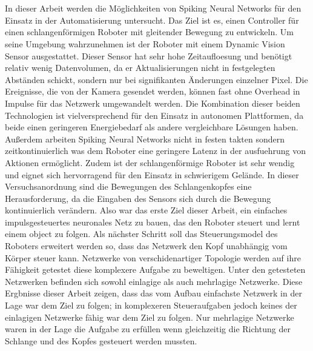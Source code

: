 \chapter{\abstractname}
In dieser Arbeit werden die Möglichkeiten von Spiking Neural Networks für den Einsatz in der Automatisierung untersucht. Das Ziel ist es, einen Controller für einen schlangenförmigen Roboter mit gleitender Bewegung zu entwickeln. Um seine Umgebung wahrzunehmen ist der Roboter mit einem Dynamic Vision Sensor ausgestattet. Dieser Sensor hat sehr hohe Zeitaufloesung und benötigt relativ wenig Datenvolumen, da er Aktualisierungen nicht in festgelegten Abständen schickt, sondern nur bei signifikanten Änderungen einzelner Pixel. Die Ereignisse, die von der Kamera gesendet werden, können fast ohne Overhead in Impulse für das Netzwerk umgewandelt werden. Die Kombination dieser beiden Technologien ist vielversprechend für den Einsatz in autonomen Plattformen, da beide einen geringeren Energiebedarf als andere vergleichbare Lösungen haben. Außerdem arbeiten Spiking Neural Networks nicht in festen takten sondern zeitkontinuierlich was dem Roboter eine geringere Latenz in der ausfuehrung von Aktionen ermöglicht. Zudem ist der schlangenförmige Roboter ist sehr wendig und eignet sich hervorragend für den Einsatz in schwierigem Gelände.
In dieser Versuchsanordnung sind die Bewegungen des Schlangenkopfes eine Herausforderung, da die Eingaben des Sensors sich durch die Bewegung kontinuierlich verändern. Also war das erste Ziel dieser Arbeit, ein einfaches impulsgesteuertes neuronales Netz zu bauen, das den Roboter steuert und lernt einem object zu folgen. Als nächster Schritt soll das Steuerungsmodel des Roboters erweitert werden so, dass das Netzwerk den Kopf unabhängig vom Körper steuer kann. Netzwerke von verschidenartiger Topologie werden auf ihre Fähigkeit getestet diese komplexere Aufgabe zu beweltigen. Unter den getesteten Netzwerken befinden sich sowohl einlagige als auch mehrlagige Netzwerke.
Diese Ergbnisse dieser Arbeit zeigen, dass das vom Aufbau einfachste Netzwerk in der Lage war dem Ziel zu folgen; in komplexeren Steueraufgaben jedoch keines der einlagigen Netzwerke fähig war dem Ziel zu folgen. 
Nur mehrlagige Netzwerke waren in der Lage die Aufgabe zu erfüllen wenn gleichzeitig die Richtung der Schlange und des Kopfes gesteuert werden mussten.




